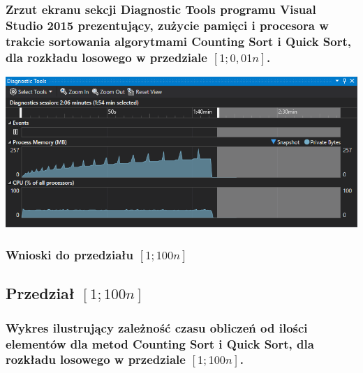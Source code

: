 \documentclass[polish,polish,a4paper]{article}
\begin{document}
\begin{spacing}{1.5}
\subsubsection*{Zrzut ekranu sekcji Diagnostic Tools programu Visual Studio 2015 prezentujący, zużycie pamięci i procesora w trakcie sortowania algorytmami Counting Sort i  Quick Sort, dla rozkładu losowego w przedziale $[1;0,01n]$.}

	\begin{minipage}[H]{\textwidth}
	\begin{center}
		\includegraphics[scale=0.85]{zad4pamiec001n.png}
		\label{fig:zad4pamiec001n}
	\end{center}
	\end{minipage}

\subsubsection{Wnioski do przedziału $[1;100n]$}

\subsection{Przedział $[1;100n]$}

\subsubsection*{Wykres ilustrujący zależność czasu obliczeń od ilości elementów dla metod Counting Sort i  Quick Sort, dla rozkładu losowego w przedziale $[1;100n]$.}


\end{spacing}
\end{document}
